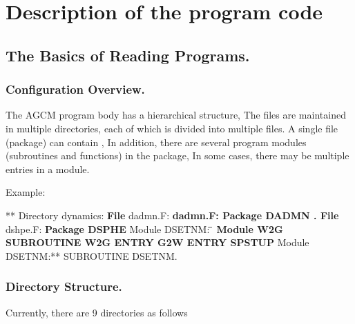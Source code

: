 \hypertarget{description-of-the-program-code}{%
\section{Description of the program
code}\label{description-of-the-program-code}}

\hypertarget{the-basics-of-reading-programs.}{%
\subsection{The Basics of Reading
Programs.}\label{the-basics-of-reading-programs.}}

\hypertarget{configuration-overview.}{%
\subsubsection{Configuration Overview.}\label{configuration-overview.}}

The AGCM program body has a hierarchical structure, The files are
maintained in multiple directories, each of which is divided into
multiple files. A single file (package) can contain , In addition, there
are several program modules (subroutines and functions) in the package,
In some cases, there may be multiple entries in a module.

Example:

** Directory\textbf{} dynamics: \textbf{ {\textbf{File}} }dadmn.F:
\textbf{dadmn.F: \blanket* Package DADMN . {\textbf{File}} }dshpe.F:
\textbf{ \blanket* Package DSPHE } Module DSETNM: \textbf{̄
{\textbf{Module W2G}} SUBROUTINE W2G ENTRY G2W ENTRY SPSTUP } Module
DSETNM:** SUBROUTINE DSETNM.

\hypertarget{directory-structure.}{%
\subsubsection{Directory Structure.}\label{directory-structure.}}

Currently, there are 9 directories as follows

